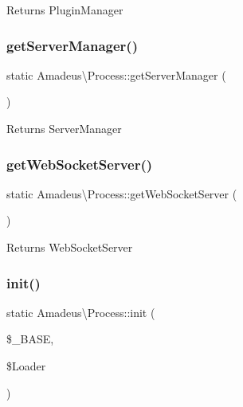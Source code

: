 \begin{DoxyReturn}{Returns}
Plugin\+Manager 
\end{DoxyReturn}
\mbox{\label{classAmadeus_1_1Process_a5a67131a3a89bf03345bca386f7d37e1}} 
\subsubsection{\texorpdfstring{get\+Server\+Manager()}{getServerManager()}}
{\footnotesize\ttfamily static Amadeus\textbackslash{}\+Process\+::get\+Server\+Manager (\begin{DoxyParamCaption}{ }\end{DoxyParamCaption})\hspace{0.3cm}{\ttfamily [static]}}

\begin{DoxyReturn}{Returns}
Server\+Manager 
\end{DoxyReturn}
\mbox{\label{classAmadeus_1_1Process_aa6efafb0e373aee48feb2698ed892c50}} 
\subsubsection{\texorpdfstring{get\+Web\+Socket\+Server()}{getWebSocketServer()}}
{\footnotesize\ttfamily static Amadeus\textbackslash{}\+Process\+::get\+Web\+Socket\+Server (\begin{DoxyParamCaption}{ }\end{DoxyParamCaption})\hspace{0.3cm}{\ttfamily [static]}}

\begin{DoxyReturn}{Returns}
Web\+Socket\+Server 
\end{DoxyReturn}
\mbox{\label{classAmadeus_1_1Process_aae77393f6d27409f31f947c66f042bde}} 
\subsubsection{\texorpdfstring{init()}{init()}}
{\footnotesize\ttfamily static Amadeus\textbackslash{}\+Process\+::init (\begin{DoxyParamCaption}\item[{string}]{\$\+\_\+\+B\+A\+SE,  }\item[{Class\+Loader}]{\$\+Loader }\end{DoxyParamCaption})\hspace{0.3cm}{\ttfamily [static]}}


